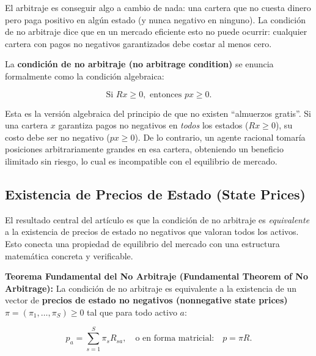 \documentclass[12pt]{article}
\begin{document}
\begin{intuicion}
El arbitraje es conseguir algo a cambio de nada: una cartera que no cuesta dinero pero paga positivo en alg\'un estado (y nunca negativo en ninguno). La condici\'on de no arbitraje dice que en un mercado eficiente esto no puede ocurrir: cualquier cartera con pagos no negativos garantizados debe costar al menos cero.
\end{intuicion}

La \textbf{condici\'on de no arbitraje (no arbitrage condition)} se enuncia formalmente como la condici\'on algebraica:

\begin{equation}
  \text{Si } Rx \geq 0, \text{ entonces } px \geq 0.
  \label{eq:noarbitraje}
\end{equation}

\begin{intuicionmat}
Esta es la versi\'on algebraica del principio de que no existen ``almuerzos gratis''. Si una cartera $x$ garantiza pagos no negativos en \textit{todos} los estados ($Rx \geq 0$), su costo debe ser no negativo ($px \geq 0$). De lo contrario, un agente racional tomar\'ia posiciones arbitrariamente grandes en esa cartera, obteniendo un beneficio ilimitado sin riesgo, lo cual es incompatible con el equilibrio de mercado.
\end{intuicionmat}

\subsection{Existencia de Precios de Estado (State Prices)}

\begin{intuicion}
El resultado central del art\'iculo es que la condici\'on de no arbitraje es \textit{equivalente} a la existencia de precios de estado no negativos que valoran todos los activos. Esto conecta una propiedad de equilibrio del mercado con una estructura matem\'atica concreta y verificable.
\end{intuicion}

\textbf{Teorema Fundamental del No Arbitraje (Fundamental Theorem of No Arbitrage):} La condici\'on de no arbitraje es equivalente a la existencia de un vector de \textbf{precios de estado no negativos (nonnegative state prices)} $\pi = (\pi_1, \ldots, \pi_S) \geq 0$ tal que para todo activo $a$:

\begin{equation}
  p_a = \sum_{s=1}^{S} \pi_s R_{sa}, \quad \text{o en forma matricial:} \quad p = \pi R.
  \label{eq:precioestado}
\end{equation}
\end{document}

